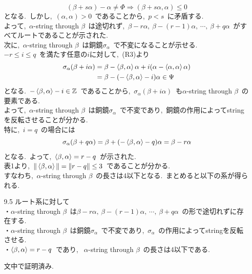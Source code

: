 \documentclass[uplatex,dvipdfmx]{jsarticle}
\begin{document}
\begin{equation*}
    (\beta + s\alpha) - \alpha \neq \Phi \Rightarrow (\beta + s\alpha, \alpha) \leq 0
\end{equation*}
となる.~しかし,~$(\alpha,\alpha) >0$~であることから,~$p<s$~に矛盾する.\\
よって,~$\alpha$-string through $\beta$~は途切れず,~$\beta-r\alpha,~\beta-(r-1)\alpha,~\cdots,~\beta+q\alpha$~がすべてルートであることが示された.\\
次に,~$\alpha$-string through $\beta$~は銅鏡$\sigma_\alpha$~で不変になることが示せる.\\
$-r \leq i \leq q$~を満たす任意の$i$に対して,~(R3)より
\begin{equation*}
    \begin{split}
        \sigma_\alpha (\beta + i\alpha) &= \beta - \ev{\beta,\alpha}\alpha + i(\alpha - \ev{\alpha,\alpha}\alpha)\\
        &= \beta - (-\ev{\beta,\alpha}-i)\alpha \in \Psi
    \end{split}
\end{equation*}
となる.~$-\ev{\beta,\alpha}-i \in \mathbb{Z}$~であることから,~$\sigma_\alpha (\beta + i\alpha)$~も$\alpha$-string through $\beta$~の要素である.\\
よって,~$\alpha$-string through $\beta$~は銅鏡$\sigma_\alpha$~で不変であり,~銅鏡の作用によってstringを反転させることが分かる.\\
特に,~$i =q$~の場合には
\begin{equation*}
    \sigma_\alpha (\beta + q\alpha) = \beta + (-\ev{\beta,\alpha}-q)\alpha = \beta - r\alpha
\end{equation*}
となる.~よって,~$\ev{\beta,\alpha} = r-q$~が示された.\\
表1より,~$\| \ev{\beta,\alpha} \| = \| r-q \| \leq 3 $~であることが分かる.\\
すなわち,~$\alpha$-string through $\beta$~の長さは4以下となる.~まとめると以下の系が得られる.
\begin{mycor}{9.5}
    ルート系に対して\\
    ・$\alpha$-string through $\beta$~は$\beta - r\alpha,~\beta-(r-1)\alpha,~\cdots,~\beta+q\alpha$~の形で途切れずに存在する.\\
    ・$\alpha$-string through $\beta$~は銅鏡$\sigma_\alpha$~で不変であり,~$\sigma_\alpha$~の作用によってstringを反転させる.\\
    ・$\ev{\beta,\alpha} = r-q$~であり,~ $\alpha$-string through $\beta$~の長さは4以下である.
\end{mycor}
\begin{myproof}
    文中で証明済み.
\end{myproof}
\newpage
\end{document}
